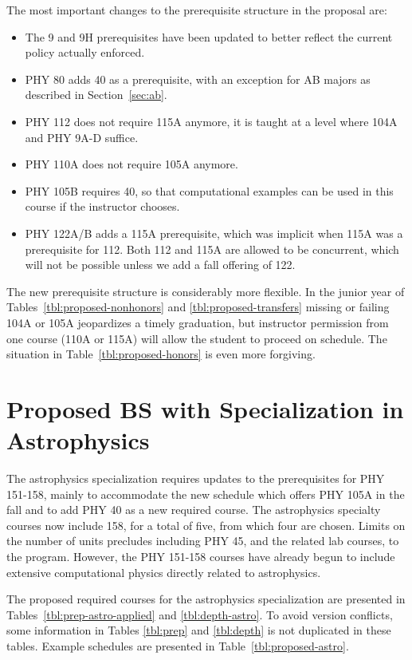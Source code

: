 \documentclass[12pt]{article}
\begin{document}
The most important changes to the prerequisite structure in the proposal are:
\begin{itemize}
\item The 9 and 9H prerequisites have been updated to better reflect the current policy actually enforced.
\item PHY 80 adds 40 as a prerequisite, with an exception for AB majors as described in Section~\ref{sec:ab}.
\item PHY 112 does not require 115A anymore, it is taught at a level where 104A and PHY 9A-D suffice.  
\item PHY 110A does not require 105A anymore. 
\item PHY 105B requires 40, so that computational examples can be used in this course if the instructor chooses.
\item PHY 122A/B adds a 115A prerequisite, which was implicit when 115A was a prerequisite for 112.  Both 112 and 115A are allowed to be concurrent, which will not be possible unless we add a fall offering of 122.
\end{itemize}
The new prerequisite structure is considerably more flexible.  In the
junior year of Tables~\ref{tbl:proposed-nonhonors} and
\ref{tbl:proposed-transfers} missing or failing 104A or 105A
jeopardizes a timely graduation, but instructor permission from one
course (110A or 115A) will allow the student to proceed on schedule.
The situation in Table~\ref{tbl:proposed-honors} is even more
forgiving.

\newpage

\section{Proposed BS with Specialization in Astrophysics}
The astrophysics specialization requires updates to the prerequisites
for PHY 151-158, mainly to accommodate the new schedule which offers
PHY 105A in the fall and to add PHY 40 as a new required course.  The
astrophysics specialty courses now include 158, for a total of five,
from which four are chosen.  Limits on the number of units precludes
including PHY 45, and the related lab courses, to the program.
However, the PHY 151-158 courses have already begun to include
extensive computational physics directly related to astrophysics.

The proposed required courses for the astrophysics specialization are presented in
Tables~\ref{tbl:prep-astro-applied} and \ref{tbl:depth-astro}.  To avoid
version conflicts, some information in Tables \ref{tbl:prep} and
\ref{tbl:depth} is not duplicated in these tables.  Example schedules are presented
in Table~\ref{tbl:proposed-astro}.
\end{document}
